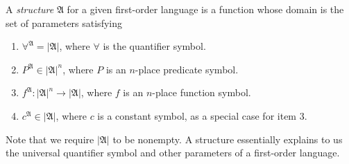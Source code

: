 A \textit{structure} $\mathfrak{A}$ for a given first-order language is a function whose domain is the set of parameters satisfying
\begin{enumerate}
  \item $\forall^{\mathfrak{A}}=\left|\mathfrak{A}\right|$, where $\forall$ is the quantifier symbol.
  \item $P^{\mathfrak{A}}\in\left|\mathfrak{A}\right|^{n}$, where $P$ is an $n$-place predicate symbol.
  \item $f^{\mathfrak{A}}:\left|\mathfrak{A}\right|^{n}\rightarrow\left|\mathfrak{A}\right|$, where $f$ is an $n$-place function symbol.
  \item $c^{\mathfrak{A}}\in\left|\mathfrak{A}\right|$, where $c$ is a constant symbol, as a special case for item 3.
\end{enumerate}
Note that we require $\left|\mathfrak{A}\right|$ to be nonempty. A structure essentially explains to us the universal quantifier symbol and other parameters of a first-order language.

